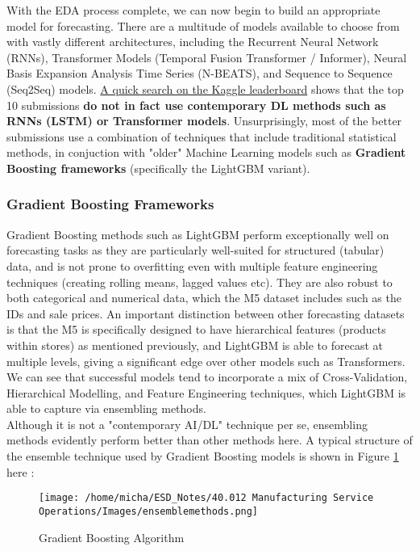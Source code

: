 \documentclass[12pt]{article}
\begin{document}
With the EDA process complete, we can now begin to build an appropriate model for forecasting. There are a multitude of models available to choose from with vastly different architectures, including the Recurrent Neural Network (RNNs), Transformer Models (Temporal Fusion Transformer / Informer), Neural Basis Expansion Analysis Time Series (N-BEATS), and Sequence to Sequence (Seq2Seq) models. \href{https://www.kaggle.com/c/m5-forecasting-accuracy/leaderboard}{A quick search on the Kaggle leaderboard} shows that the top 10 submissions \textbf{do not in fact use contemporary DL methods such as RNNs (LSTM) or Transformer models}. Unsurprisingly, most of the better submissions use a combination of techniques that include traditional statistical methods, in conjuction with "older" Machine Learning models such as \textbf{Gradient Boosting frameworks} (specifically the LightGBM variant). 

\subsubsection*{Gradient Boosting Frameworks}

Gradient Boosting methods such as LightGBM perform exceptionally well on forecasting tasks as they are particularly well-suited for structured (tabular) data, and is not prone to overfitting even with multiple feature engineering techniques (creating rolling means, lagged values etc). They are also robust to both categorical and numerical data, which the M5 dataset includes such as the IDs and sale prices. An important distinction between other forecasting datasets is that the M5 is specifically designed to have hierarchical features (products within stores) as mentioned previously, and LightGBM is able to forecast at multiple levels, giving a significant edge over other models such as Transformers. We can see that successful models tend to incorporate a mix of Cross-Validation, Hierarchical Modelling, and Feature Engineering techniques, which LightGBM is able to capture via ensembling methods. \\

\noindent Although it is not a "contemporary AI/DL" technique per se, ensembling methods evidently perform better than other methods here. A typical structure of the ensemble technique used by Gradient Boosting models is shown in Figure \ref{fig:6-gradboost} here \cite{ensemble}: 

\begin{figure}[H]
    \centering
    \texttt{[image: /home/micha/ESD\_Notes/40.012 Manufacturing Service Operations/Images/ensemblemethods.png]}
    \caption{Gradient Boosting Algorithm}
    \label{fig:6-gradboost}
\end{figure} 
\end{document}
